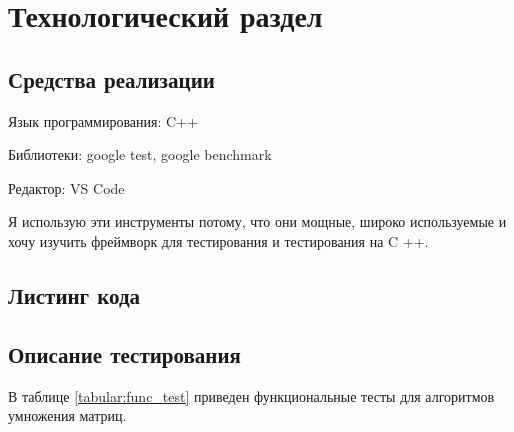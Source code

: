 \chapter{Технологический раздел}
\label{cha:impl}



\section{Средства реализации}

Язык программирования: C++

Библиотеки: google test, google benchmark

Редактор: VS Code

Я использую эти инструменты потому, что они мощные, широко используемые и
хочу изучить фреймворк для тестирования и тестирования на C ++.



\section{Листинг кода}






\section{Описание тестирования}

В таблице \ref{tabular:func_test} приведен функциональные тесты
для алгоритмов умножения матриц.

\def\arraystretch{1.2}
\setlength\tabcolsep{0.5cm}

